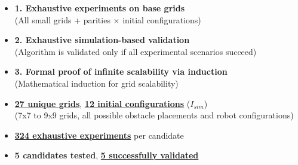 \begin{frame}{}

\vspace{0.2cm}
\begin{itemize}\setlength\itemsep{0.4cm}
    \item<1-> \textbf{1. Exhaustive experiments on base grids}\\ \textcolor{softgray}{\scriptsize (All small grids + parities $\times$ initial configurations)}
    \item<2-> \textbf{2. Exhaustive simulation-based validation}\\ \textcolor{softgray}{\scriptsize (Algorithm is validated only if all experimental scenarios succeed)}
    \item<3-> \textbf{3. Formal proof of infinite scalability via induction}\\ \textcolor{softgray}{\scriptsize (Mathematical induction for grid scalability)}
\end{itemize}
\end{frame}


\begin{frame}{}
\vspace{0.4cm}
\begin{itemize}\setlength\itemsep{0.6cm}
    \item \href{https://luminousrobots.github.io/RoASt-exec1-classes/grid_definitions.txt}{\textcolor{accent}{\textbf{27 unique grids}}}, \href{https://luminousrobots.github.io/RoASt-exec1-classes/initial_configs_viewer}{\textcolor{accent}{\textbf{12 initial configurations}}} ($I_{sim}$)
    \\ \textcolor{softgray}{\scriptsize (7x7 to 9x9 grids, all possible obstacle placements and robot configurations)} \pause

    \item \href{https://luminousrobots.github.io/RoASt-exec1-classes/_all_possible_configurations.log}{\textcolor{accent}{\textbf{324 exhaustive experiments}}} per candidate \pause
    \item \textbf{5 candidates tested}, \href{https://luminousrobots.github.io/RoASt-Executions/Exec1_Algo1_Pole_Goals1_Main/viewer.html}{\textcolor{accent}{\textbf{5 successfully validated}}}
\end{itemize}

\end{frame}